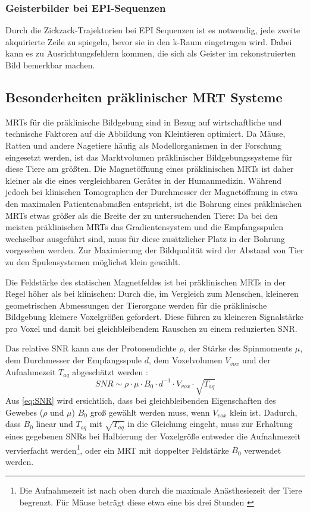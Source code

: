 \subsubsection{Geisterbilder bei EPI-Sequenzen}
Durch die Zickzack-Trajektorien bei EPI Sequenzen ist es notwendig, jede zweite akquirierte Zeile zu spiegeln, bevor sie in den k-Raum eingetragen wird. Dabei kann es zu Ausrichtungsfehlern kommen, die sich als Geister im rekonstruierten Bild bemerkbar machen\cite{Ianni2018}.

\subsection{Besonderheiten präklinischer MRT Systeme}
MRTs für die präklinische Bildgebung sind in Bezug auf wirtschaftliche und technische Faktoren auf die Abbildung von Kleintieren optimiert. Da Mäuse, Ratten und andere Nagetiere häufig als Modellorganismen in der Forschung eingesetzt werden, ist das Marktvolumen präklinischer Bildgebungssysteme für diese Tiere am größten. \cite{GBanimalStat} Die Magnetöffnung eines präklinischen MRTs ist daher kleiner als die eines vergleichbaren Gerätes in der Humanmedizin. Während jedoch bei klinischen Tomographen der Durchmesser der Magnetöffnung in etwa den maximalen Patientenabmaßen entspricht, ist die Bohrung eines präklinischen MRTs etwas größer als die Breite der zu untersuchenden Tiere: Da bei den meisten präklinischen MRTs das Gradientensystem und die Empfangsspulen wechselbar ausgeführt sind, muss für diese zusätzlicher Platz in der Bohrung vorgesehen werden. Zur Maximierung der Bildqualität wird der Abstand von Tier zu den Spulensystemen möglichst klein gewählt.

Die Feldstärke des statischen Magnetfeldes ist bei präklinischen MRTs in der Regel höher als bei klinischen: Durch die, im Vergleich zum Menschen, kleineren geometrischen Abmessungen der Tierorgane werden für die präklinische Bildgebung kleinere Voxelgrößen gefordert. Diese führen zu kleineren Signalstärke pro Voxel und damit bei gleichbleibendem Rauschen zu einem reduzierten SNR.

Das relative SNR kann aus der Protonendichte $\rho$, der Stärke des Spinmoments $\mu$, dem Durchmesser der Empfangsspule $d$, dem Voxelvolumen $V_{vox}$ und der Aufnahmezeit $T_{aq}$ abgeschätzt werden \cite[S.~161]{Kiessling2017}:
\begin{equation}
\label{eq:SNR}
	SNR \sim \rho \cdot \mu \cdot B_0 \cdot d^{-1} \cdot V_{vox} \cdot \sqrt{T_{aq}}
\end{equation}
Aus \autoref{eq:SNR} wird ersichtlich, dass bei gleichbleibenden Eigenschaften des Gewebes ($\rho$ und $\mu$) $B_0$ groß gewählt werden muss, wenn $V_{vox}$ klein ist.
Dadurch, dass $B_0$ linear und $T_{aq}$ mit $\sqrt{T_{aq}}$ in die Gleichung eingeht, muss zur Erhaltung eines gegebenen SNRs bei Halbierung der Voxelgröße entweder die Aufnahmezeit vervierfacht werden\footnote{Die Aufnahmezeit ist nach oben durch die maximale Anästhesiezeit der Tiere begrenzt. Für Mäuse beträgt diese etwa eine bis drei Stunden \cite{Kiessling2017}}, oder ein MRT mit doppelter Feldstärke $B_0$ verwendet werden.

